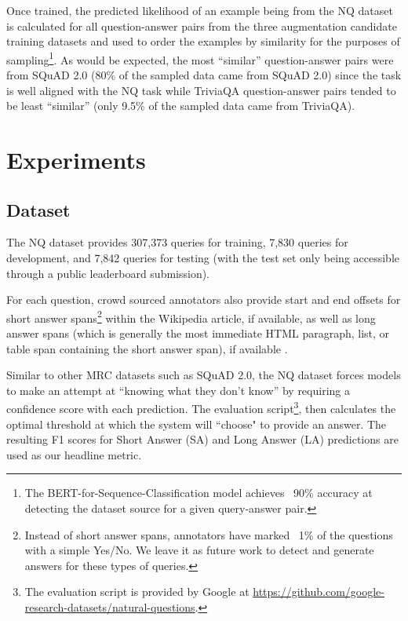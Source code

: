 \documentclass[letterpaper]{article} \usepackage{aaai20}  \usepackage{times}  \usepackage{helvet} \usepackage{courier}  \usepackage[hyphens]{url}  \usepackage{graphicx} \urlstyle{rm} \def\UrlFont{\rm}  \usepackage{graphicx}  \frenchspacing  \setlength{\pdfpagewidth}{8.5in}  \setlength{\pdfpageheight}{11in}  \usepackage{amsmath}
\begin{document}
Once trained, the predicted likelihood of an example being from the NQ dataset is calculated for all question-answer pairs from the three augmentation candidate training datasets and used to order the examples by similarity for the purposes of sampling\footnote{The BERT-for-Sequence-Classification model achieves ~90\% accuracy at detecting the dataset source for a given query-answer pair.}. As would be expected, the most ``similar'' question-answer pairs were from SQuAD 2.0 (\raisebox{-.5ex}{\textasciitilde}80\% of the sampled data came from SQuAD 2.0) since the task is well aligned with the NQ task while TriviaQA question-answer pairs tended to be least ``similar'' (only \raisebox{-.5ex}{\textasciitilde}9.5\% of the sampled data came from TriviaQA).    \section{Experiments}
\label{sec:experiments}

\subsection{Dataset}
\label{subsec:dataset}
The NQ dataset provides 307,373 queries for training, 7,830 queries for development, and 7,842 queries for testing (with the test set only being accessible through a public leaderboard submission).  


For each question, crowd sourced annotators also provide start and end offsets for short answer spans\footnote{Instead of short answer spans, annotators have marked ~1\% of the questions with a simple Yes/No.  We leave it as future work to detect and generate answers for these types of queries.} within the Wikipedia article, if available, as well as long answer spans (which is generally the most immediate HTML paragraph, list, or table span containing the short answer span), if available \cite{Kwiatkowski2019NaturalQA}.

Similar to other MRC datasets such as SQuAD 2.0, the NQ dataset forces models to make an attempt at ``knowing what they don't know'' by requiring a confidence score with each prediction. The evaluation script\footnote{The evaluation script is provided by Google at \url{https://github.com/google-research-datasets/natural-questions}.}, then calculates the optimal threshold at which the system will ``choose" to provide an answer.  The resulting F1 scores for Short Answer (SA) and Long Answer (LA) predictions are used as our headline metric.
\end{document}
